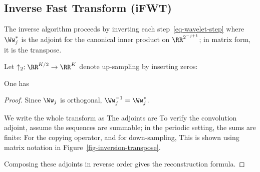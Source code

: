                                                             
\subsection{Inverse Fast Transform (iFWT)}

The inverse algorithm proceeds by inverting each step~\eqref{eq-wavelet-step}
where $\Ww_j^{*}$ is the adjoint for the canonical inner product on $\RR^{2^{-j+1}}$; in matrix form, it is the transpose.

Let $\uparrow_2 : \RR^{K/2} \rightarrow \RR^K$ denote up-sampling by inserting zeros:

\begin{prop}
One has
\end{prop}

\begin{proof}
Since $\Ww_j$ is orthogonal, $\Ww_j^{-1} = \Ww_j^*$.
 
We write the whole transform as 
The adjoints are
To verify the convolution adjoint, assume the sequences are summable; in the periodic setting, the sums are finite:
For the copying operator,
and for down-sampling,
This is shown using matrix notation in Figure~\ref{fig-inversion-transpose}.
 
Composing these adjoints in reverse order gives the reconstruction formula.
\end{proof}



